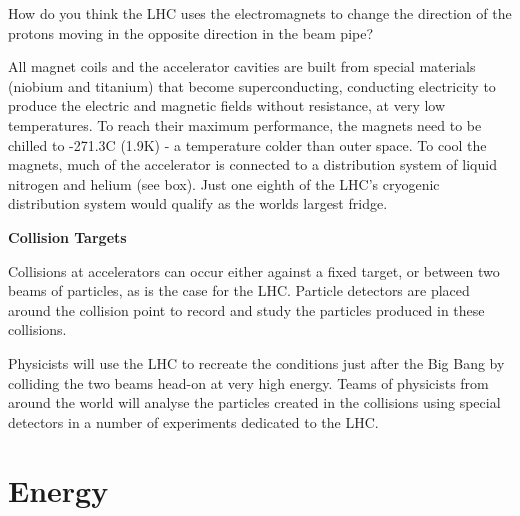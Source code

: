 \vspace{.2cm}
\begin{minipage}{0.9\textwidth}
\begin{framed}
\begin{exercise}
{How do you think the LHC uses the electromagnets to change the direction of the protons moving in the opposite direction in the beam pipe?}
\end{exercise}
\end{framed}
\end{minipage}
\vspace{.2cm}

\;
\;


\;
\noindent
All magnet coils and the accelerator cavities are built from special materials (niobium and titanium) that become superconducting, conducting electricity to produce the electric and magnetic fields without resistance, at very low temperatures. To reach their maximum performance, the magnets need to be chilled to -271.3C (1.9K) - a temperature colder than outer space. To cool the magnets, much of the accelerator is connected to a distribution system of liquid nitrogen and helium (see box). Just one eighth of the LHC's cryogenic distribution system would qualify as the worlds largest fridge.

\;
\;
\;

\noindent
\textbf{Collision Targets}

\;
\;

\noindent
Collisions at accelerators can occur either against a fixed target, or between two beams of particles, as is the case for the LHC. Particle detectors are placed around the collision point to record and study the particles produced in these collisions.

\;
\noindent
Physicists will use the LHC to recreate the conditions just after the Big Bang by colliding the two beams head-on at very high energy. Teams of physicists from around the world will analyse the particles created in the collisions using special detectors in a number of experiments dedicated to the LHC.

\section{Energy}


